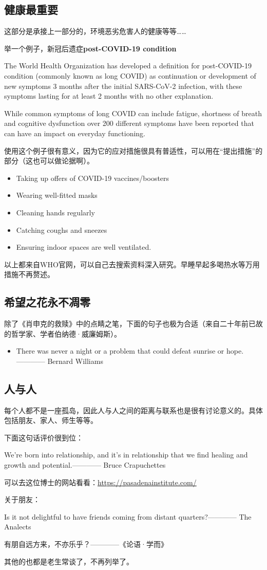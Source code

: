 \subsection{健康最重要}
这部分是承接上一部分的，环境恶劣危害人的健康等等……
\par
举一个例子，新冠后遗症\textbf{post-COVID-19 condition}
\par
The World Health Organization has developed a definition for post-COVID-19 condition (commonly known as long COVID) as continuation or development of new symptoms 3 months after the initial SARS-CoV-2 infection, with these symptoms lasting for at least 2 months with no other explanation.
\par
While common symptoms of long COVID can include fatigue, shortness of breath and cognitive dysfunction over 200 different symptoms have been reported that can have an impact on everyday functioning.
\par
使用这个例子很有意义，因为它的应对措施很具有普适性，可以用在“提出措施”的部分（这也可以做论据啊）。
\begin{itemize}
    \item Taking up offers of COVID-19 vaccines/boosters
    \item Wearing well-fitted masks
    \item Cleaning hands regularly
    \item Catching coughs and sneezes
    \item Ensuring indoor spaces are well ventilated.
\end{itemize}
\par
以上都来自WHO官网，可以自己去搜索资料深入研究。早睡早起多喝热水等万用措施不再赘述。
\subsection{希望之花永不凋零}
除了《肖申克的救赎》中的点睛之笔，下面的句子也极为合适（来自二十年前已故的哲学家、学者伯纳德·威廉姆斯）。
\begin{itemize}
    \item There was never a night or a problem that could defeat sunrise or hope. ———— Bernard Williams
\end{itemize}
\subsection{人与人}
每个人都不是一座孤岛，因此人与人之间的距离与联系也是很有讨论意义的。具体包括朋友、家人、师生等等。
\par
下面这句话评价很到位：
\par
We're born into relationship, and it's in relationship that we find healing and growth and potential.———— Bruce Crapuchettes
\par
可以去这位博士的网站看看：\href{https://pasadenainstitute.com/}{https://pasadenainstitute.com/}
\par 
关于朋友：
\par
Is it not delightful to have friends coming from distant quarters?———— The Analects
\par 
有朋自远方来，不亦乐乎？————《论语·学而》
\par
其他的也都是老生常谈了，不再列举了。